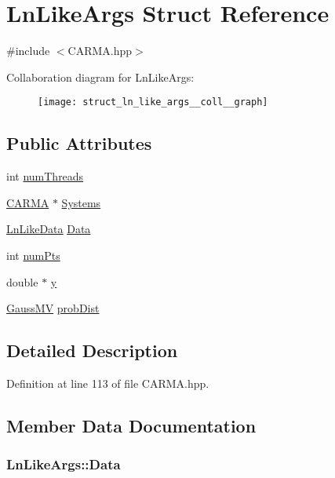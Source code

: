 \hypertarget{struct_ln_like_args}{\section{Ln\-Like\-Args Struct Reference}
\label{struct_ln_like_args}
}


{\ttfamily \#include $<$C\-A\-R\-M\-A.\-hpp$>$}



Collaboration diagram for Ln\-Like\-Args\-:\nopagebreak
\begin{figure}[H]
\begin{center}
\leavevmode
\texttt{[image: struct\_ln\_like\_args\_\_coll\_\_graph]}
\end{center}
\end{figure}
\subsection*{Public Attributes}
\begin{DoxyCompactItemize}
\item 
int \hyperlink{struct_ln_like_args_ad84da20749d9935f6a5a04b5c56d729a}{num\-Threads}
\item 
\hyperlink{class_c_a_r_m_a}{C\-A\-R\-M\-A} $\ast$ \hyperlink{struct_ln_like_args_af605bb6dcb409ad41dfc1a00c1e12c3f}{Systems}
\item 
\hyperlink{struct_ln_like_data}{Ln\-Like\-Data} \hyperlink{struct_ln_like_args_aa9a0a2c4945292f8429e4f0738db611b}{Data}
\item 
int \hyperlink{struct_ln_like_args_a14cedd7e2fed9d152ce3de6383567dad}{num\-Pts}
\item 
double $\ast$ \hyperlink{struct_ln_like_args_a49e48f13e6203cf7f629d3485416874f}{y}
\item 
\hyperlink{struct_gauss_m_v}{Gauss\-M\-V} \hyperlink{struct_ln_like_args_ad8d1ee1e21bab664c116720df98cf287}{prob\-Dist}
\end{DoxyCompactItemize}


\subsection{Detailed Description}


Definition at line 113 of file C\-A\-R\-M\-A.\-hpp.



\subsection{Member Data Documentation}
\hypertarget{struct_ln_like_args_aa9a0a2c4945292f8429e4f0738db611b}{
\subsubsection[{Data}]{ Ln\-Like\-Args\-::\-Data}}\label{struct_ln_like_args_aa9a0a2c4945292f8429e4f0738db611b}


